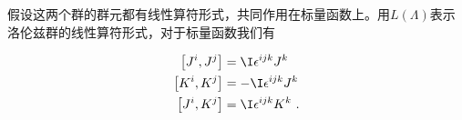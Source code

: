 假设这两个群的群元都有线性算符形式，共同作用在标量函数上。用$L(\Lambda)$表示洛伦兹群的线性算符形式，对于标量函数我们有
\begin{equation}

\end{equation}


\begin{equation}
\begin{aligned}
\left[J^i,J^j\right]&=\I\epsilon^{ijk}J^k\\
\left[K^i, K^j\right]&=-\I \epsilon^{i j k} J^k\\
\left[J^i, K^j\right]&=\I \epsilon^{i j k} K^k~.
\end{aligned}
\end{equation}

